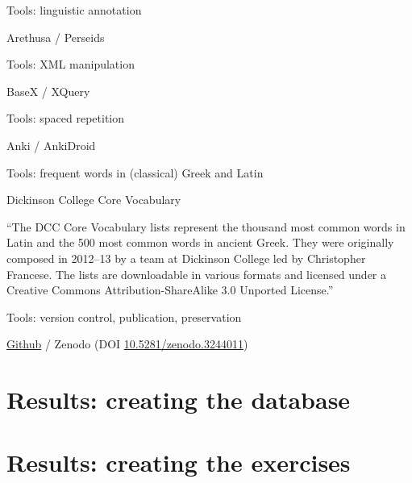 \documentclass{beamer}
\begin{document}
\begin{frame}{Tools: linguistic annotation}

Arethusa / Perseids

\end{frame}

\begin{frame}{Tools: XML manipulation}

BaseX / XQuery

\end{frame}

\begin{frame}{Tools: spaced repetition}

Anki / AnkiDroid

\end{frame}

\begin{frame}{Tools: frequent words in (classical) Greek and Latin}

\alert{Dickinson College Core Vocabulary}

``The DCC Core Vocabulary lists represent the thousand most common words in Latin and the 500 most common words in ancient Greek. They were originally composed in 2012–13 by a team at Dickinson College led by \alert{Christopher Francese}. The lists are downloadable in various formats and licensed under a Creative Commons Attribution-ShareAlike 3.0 Unported License.''

\end{frame}

\begin{frame}{Tools: version control, publication, preservation}

\href{https://github.com/nevenjovanovic/sunoikisis2019zg-eklogai}{Github} / Zenodo (DOI \href{https://doi.org/10.5281/zenodo.3244011}{10.5281/zenodo.3244011})



\end{frame}

\section{Results: creating the database}

\begin{frame}[standout]


\end{frame}

\section{Results: creating the exercises}
\end{document}

